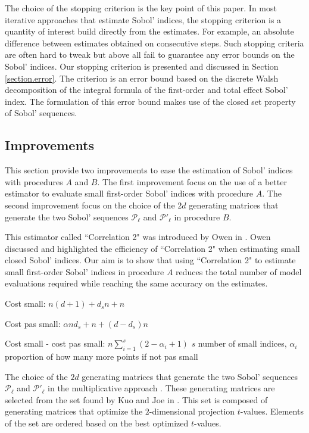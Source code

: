 \documentclass[]{elsarticle}
\theoremstyle{definition}
\begin{document}
The choice of the stopping criterion is the key point of this paper. In most iterative approaches that estimate Sobol' indices, the stopping criterion is a quantity of interest build directly from the estimates. For example, an absolute difference between estimates obtained on consecutive steps. Such stopping criteria are often hard to tweak but above all fail to guarantee any error bounds on the Sobol' indices. Our stopping criterion is presented and discussed in Section \ref{section.error}. The criterion is an error bound based on the discrete Walsh decomposition of the integral formula of the first-order and total effect Sobol' index. The formulation of this error bound makes use of the closed set property of Sobol' sequences.


\subsection{Improvements}
This section provide two improvements to ease the estimation of Sobol' indices with procedures $A$ and $B$. The first improvement focus on the use of a better estimator to evaluate small first-order Sobol' indices with procedure $A$. The second improvement focus on the choice of the $2d$ generating matrices that generate the two Sobol' sequences $\mathcal{P}_\ell$  and ${\mathcal{P}'}_\ell$ in procedure $B$.

\bigskip


This estimator called ``Correlation 2" was introduced by Owen in \cite{Owen}. Owen discussed and highlighted the efficiency of ``Correlation 2" when estimating small closed Sobol' indices. Our aim is to show that using ``Correlation 2" to estimate small first-order Sobol' indices in procedure $A$  reduces the total number of model evaluations required while reaching the same accuracy on the estimates.


Cost small: $n(d+1)+d_sn+n$

Cost pas small: $\alpha n d_s +n+(d-d_s)n$

Cost small - cost pas small: $n\sum_{i=1}^{s}(2-\alpha_i+1)$ $s$ number of small indices, $\alpha_i$ proportion of how many more points if not pas small
\bigskip

The choice of the $2d$ generating matrices that generate the two Sobol' sequences $\mathcal{P}_\ell$ and ${\mathcal{P}'}_\ell$ in the multiplicative approach \cite{crass}. These generating matrices are selected from the set found by Kuo and Joe in \cite{Kuo}. This set is composed of generating matrices that optimize the $2$-dimensional projection $t$-values. Elements of the set are ordered based on the best optimized $t$-values. 
\end{document}
